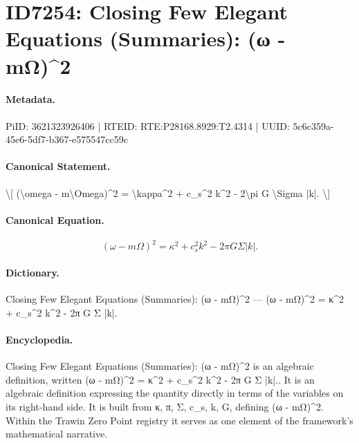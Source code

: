 \section*{ID7254: Closing Few Elegant Equations (Summaries): (ω - mΩ)\textasciicircum{}2}
\paragraph{Metadata.}
PiID: 3621323926406 | RTEID: RTE:P28168.8929:T2.4314 | UUID: 5c6c359a-45e6-5df7-b367-e575547cc59c

\paragraph{Canonical Statement.}
\textbackslash{}[ (\textbackslash{}omega - m\textbackslash{}Omega)\textasciicircum{}2 = \textbackslash{}kappa\textasciicircum{}2 + c\_s\textasciicircum{}2 k\textasciicircum{}2 - 2\textbackslash{}pi G \textbackslash{}Sigma |k|. \textbackslash{}]

\paragraph{Canonical Equation.}
\[
(\omega - m\Omega)^2 = \kappa^2 + c_s^2 k^2 - 2\pi G \Sigma |k|.
\]

\paragraph{Dictionary.}
Closing Few Elegant Equations (Summaries): (ω - mΩ)\textasciicircum{}2 — (ω - mΩ)\textasciicircum{}2 = κ\textasciicircum{}2 + c\_s\textasciicircum{}2 k\textasciicircum{}2 - 2π G Σ |k|.

\paragraph{Encyclopedia.}
Closing Few Elegant Equations (Summaries): (ω - mΩ)\textasciicircum{}2 is an algebraic definition, written (ω - mΩ)\textasciicircum{}2 = κ\textasciicircum{}2 + c\_s\textasciicircum{}2 k\textasciicircum{}2 - 2π G Σ |k|.. It is an algebraic definition expressing the quantity directly in terms of the variables on its right-hand side. It is built from κ, π, Σ, c\_s, k, G, defining (ω - mΩ)\textasciicircum{}2. Within the Trawin Zero Point registry it serves as one element of the framework's mathematical narrative.
